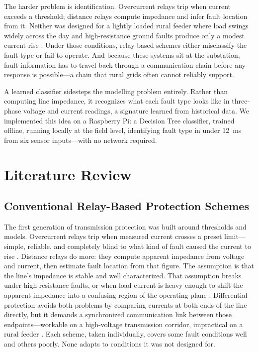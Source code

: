 \documentclass[journal]{IEEEtran}
\begin{document}
The harder problem is identification. Overcurrent relays trip when current exceeds a threshold; distance relays compute impedance and infer fault location from it. Neither was designed for a lightly loaded rural feeder where load swings widely across the day and high-resistance ground faults produce only a modest current rise \cite{ref23}. Under those conditions, relay-based schemes either misclassify the fault type or fail to operate. And because these systems sit at the substation, fault information has to travel back through a communication chain before any response is possible---a chain that rural grids often cannot reliably support.

A learned classifier sidesteps the modelling problem entirely. Rather than computing line impedance, it recognizes what each fault type looks like in three-phase voltage and current readings, a signature learned from historical data. We implemented this idea on a Raspberry Pi: a Decision Tree classifier, trained offline, running locally at the field level, identifying fault type in under 12~ms from six sensor inputs---with no network required.


\section{Literature Review}

\subsection{Conventional Relay-Based Protection Schemes}
The first generation of transmission protection was built around thresholds and models. Overcurrent relays trip when measured current crosses a preset limit---simple, reliable, and completely blind to what kind of fault caused the current to rise \cite{ref1,ref2}. Distance relays do more: they compute apparent impedance from voltage and current, then estimate fault location from that figure. The assumption is that the line's impedance is stable and well characterized. That assumption breaks under high-resistance faults, or when load current is heavy enough to shift the apparent impedance into a confusing region of the operating plane \cite{ref3,ref4}. Differential protection avoids both problems by comparing currents at both ends of the line directly, but it demands a synchronized communication link between those endpoints---workable on a high-voltage transmission corridor, impractical on a rural feeder \cite{ref2}. Each scheme, taken individually, covers some fault conditions well and others poorly. None adapts to conditions it was not designed for.
\end{document}
